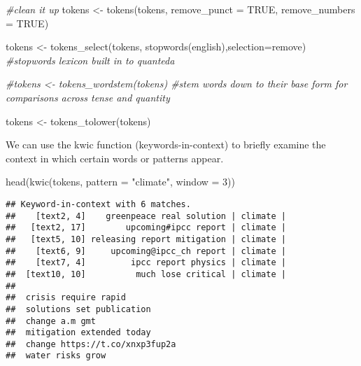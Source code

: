 \documentclass[
]{article}
\newenvironment{Shaded}{\begin{snugshade}}{\end{snugshade}}
\newcommand{\AttributeTok}[1]{\textcolor[rgb]{0.77,0.63,0.00}{#1}}
\newcommand{\CommentTok}[1]{\textcolor[rgb]{0.56,0.35,0.01}{\textit{#1}}}
\newcommand{\ConstantTok}[1]{\textcolor[rgb]{0.00,0.00,0.00}{#1}}
\newcommand{\DecValTok}[1]{\textcolor[rgb]{0.00,0.00,0.81}{#1}}
\newcommand{\FunctionTok}[1]{\textcolor[rgb]{0.00,0.00,0.00}{#1}}
\newcommand{\NormalTok}[1]{#1}
\newcommand{\OtherTok}[1]{\textcolor[rgb]{0.56,0.35,0.01}{#1}}
\newcommand{\StringTok}[1]{\textcolor[rgb]{0.31,0.60,0.02}{#1}}
\begin{document}
\begin{Shaded}
\begin{Highlighting}[]
\CommentTok{\#clean it up}
\NormalTok{tokens }\OtherTok{\textless{}{-}} \FunctionTok{tokens}\NormalTok{(tokens, }\AttributeTok{remove\_punct =} \ConstantTok{TRUE}\NormalTok{,}
                      \AttributeTok{remove\_numbers =} \ConstantTok{TRUE}\NormalTok{)}

\NormalTok{tokens }\OtherTok{\textless{}{-}} \FunctionTok{tokens\_select}\NormalTok{(tokens, }\FunctionTok{stopwords}\NormalTok{(}\StringTok{\textquotesingle{}english\textquotesingle{}}\NormalTok{),}\AttributeTok{selection=}\StringTok{\textquotesingle{}remove\textquotesingle{}}\NormalTok{) }\CommentTok{\#stopwords lexicon built in to quanteda}

\CommentTok{\#tokens \textless{}{-} tokens\_wordstem(tokens) \#stem words down to their base form for comparisons across tense and quantity}

\NormalTok{tokens }\OtherTok{\textless{}{-}} \FunctionTok{tokens\_tolower}\NormalTok{(tokens)}
\end{Highlighting}
\end{Shaded}

We can use the kwic function (keywords-in-context) to briefly examine
the context in which certain words or patterns appear.

\begin{Shaded}
\begin{Highlighting}[]
\FunctionTok{head}\NormalTok{(}\FunctionTok{kwic}\NormalTok{(tokens, }\AttributeTok{pattern =} \StringTok{"climate"}\NormalTok{, }\AttributeTok{window =} \DecValTok{3}\NormalTok{))}
\end{Highlighting}
\end{Shaded}

\begin{verbatim}
## Keyword-in-context with 6 matches.                                                     
##    [text2, 4]    greenpeace real solution | climate |
##   [text2, 17]        upcoming#ipcc report | climate |
##   [text5, 10] releasing report mitigation | climate |
##    [text6, 9]     upcoming@ipcc_ch report | climate |
##    [text7, 4]         ipcc report physics | climate |
##  [text10, 10]          much lose critical | climate |
##                                
##  crisis require rapid          
##  solutions set publication     
##  change a.m gmt                
##  mitigation extended today     
##  change https://t.co/xnxp3fup2a
##  water risks grow
\end{verbatim}
\end{document}

